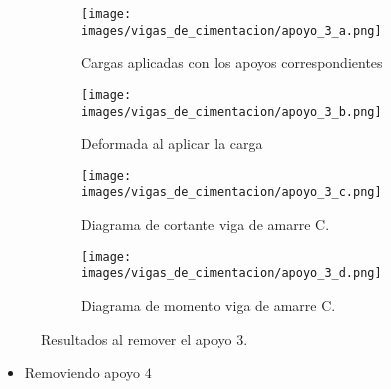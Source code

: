 \documentclass[12pt]{article}
\begin{document}
\begin{figure}[H]
\begin{subfigure}{.5\textwidth}
  \centering
  \texttt{[image: images/vigas\_de\_cimentacion/apoyo\_3\_a.png]}  
  \caption{Cargas aplicadas con los apoyos correspondientes}
  \label{fig:Cargas removiendo AP3}
\end{subfigure}
\begin{subfigure}{.5\textwidth}
  \centering
  \texttt{[image: images/vigas\_de\_cimentacion/apoyo\_3\_b.png]}  
  \caption{Deformada al aplicar la carga}
  \label{fig:Deformada AP3}
\end{subfigure}

\begin{subfigure}{.5\textwidth}
  \centering
  \texttt{[image: images/vigas\_de\_cimentacion/apoyo\_3\_c.png]}  
  \caption{Diagrama de cortante viga de amarre C.}
  \label{fig:Cortante AP3}
\end{subfigure}
\begin{subfigure}{.5\textwidth}
  \centering
  \texttt{[image: images/vigas\_de\_cimentacion/apoyo\_3\_d.png]}  
  \caption{Diagrama de momento viga de amarre C.}
  \label{fig:Momento AP1}
\end{subfigure}
\caption{Resultados al remover el apoyo 3.}
\label{fig:R apoyo 3}
\end{figure}



\newpage
\begin{itemize}
    \item Removiendo apoyo $4$
\end{itemize}
\end{document}
